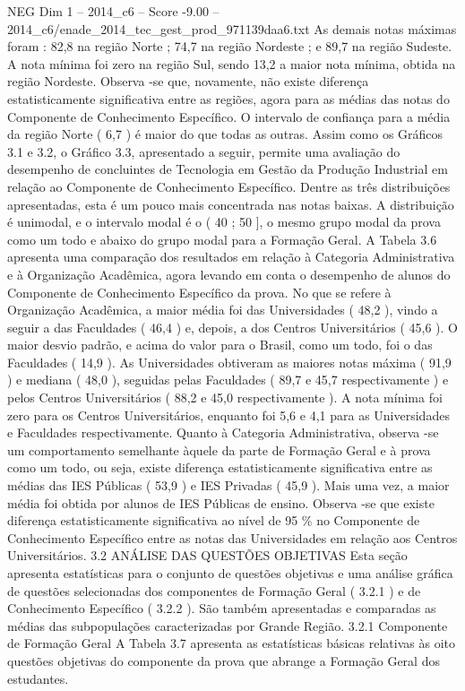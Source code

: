 \begin{textsample}{NEG Dim 1 – 2014\_c6 – Score -9.00 – 2014\_c6/enade\_2014\_tec\_gest\_prod\_971139daa6.txt}
As demais notas máximas foram : 82,8 na região Norte ; 74,7 na região Nordeste ; e 89,7 na região Sudeste.
A nota mínima foi zero na região Sul, sendo 13,2 a maior nota mínima, obtida na região Nordeste.
Observa -se que, novamente, não existe diferença estatisticamente significativa entre as regiões, agora para as médias das notas do Componente de Conhecimento Específico.
O intervalo de confiança para a média da região Norte ( 6,7 ) é maior do que todas as outras.
Assim como os Gráficos 3.1 e 3.2, o Gráfico 3.3, apresentado a seguir, permite uma avaliação do desempenho de concluintes de Tecnologia em Gestão da Produção Industrial em relação ao Componente de Conhecimento Específico.
Dentre as três distribuições apresentadas, esta é um pouco mais concentrada nas notas baixas.
A distribuição é unimodal, e o intervalo modal é o ( 40 ; 50 ], o mesmo grupo modal da prova como um todo e abaixo do grupo modal para a Formação Geral.
A Tabela 3.6 apresenta uma comparação dos resultados em relação à Categoria Administrativa e à Organização Acadêmica, agora levando em conta o desempenho de alunos do Componente de Conhecimento Específico da prova.
No que se refere à Organização Acadêmica, a maior média foi das Universidades ( 48,2 ), vindo a seguir a das Faculdades ( 46,4 ) e, depois, a dos Centros Universitários ( 45,6 ).
O maior desvio padrão, e acima do valor para o Brasil, como um todo, foi o das Faculdades ( 14,9 ).
As Universidades obtiveram as maiores notas máxima ( 91,9 ) e mediana ( 48,0 ), seguidas pelas Faculdades ( 89,7 e 45,7 respectivamente ) e pelos Centros Universitários ( 88,2 e 45,0 respectivamente ).
A nota mínima foi zero para os Centros Universitários, enquanto foi 5,6 e 4,1 para as Universidades e Faculdades respectivamente.
Quanto à Categoria Administrativa, observa -se um comportamento semelhante àquele da parte de Formação Geral e à prova como um todo, ou seja, existe diferença estatisticamente significativa entre as médias das IES Públicas ( 53,9 ) e IES Privadas ( 45,9 ).
Mais uma vez, a maior média foi obtida por alunos de IES Públicas de ensino.
Observa -se que existe diferença estatisticamente significativa ao nível de 95 \% no Componente de Conhecimento Específico entre as notas das Universidades em relação aos Centros Universitários. 3.2 ANÁLISE DAS QUESTÕES OBJETIVAS Esta seção apresenta estatísticas para o conjunto de questões objetivas e uma análise gráfica de questões selecionadas dos componentes de Formação Geral ( 3.2.1 ) e de Conhecimento Específico ( 3.2.2 ).
São também apresentadas e comparadas as médias das subpopulações caracterizadas por Grande Região. 3.2.1 Componente de Formação Geral A Tabela 3.7 apresenta as estatísticas básicas relativas às oito questões objetivas do componente da prova que abrange a Formação Geral dos estudantes.

\end{textsample}
